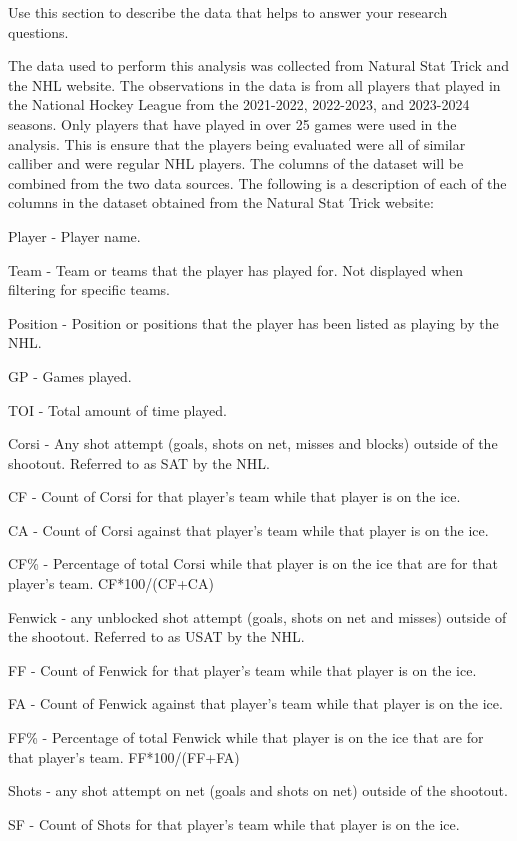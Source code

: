 \documentclass[12pt]{article}
\begin{document}
Use this section to describe the data that helps to answer your research
questions.

The data used to perform this analysis was collected from Natural Stat Trick and the NHL website. The observations in the data
is from all players that played in the National Hockey League from the 2021-2022, 2022-2023, and 2023-2024 seasons. Only players
that have played in over 25 games were used in the analysis. This is ensure that the players being evaluated were all of similar 
calliber and were regular NHL players. The columns of the dataset will be combined from the two data sources. The following is a 
description of each of the columns in the dataset obtained from the Natural Stat Trick website:

Player - Player name.

Team - Team or teams that the player has played for. Not displayed when filtering for specific teams.

Position - Position or positions that the player has been listed as playing by the NHL.

GP - Games played.

TOI - Total amount of time played.

Corsi - Any shot attempt (goals, shots on net, misses and blocks) outside of the shootout. Referred to as SAT by the NHL.

CF - Count of Corsi for that player's team while that player is on the ice.

CA - Count of Corsi against that player's team while that player is on the ice.

CF\% - Percentage of total Corsi while that player is on the ice that are for that player's team. CF*100/(CF+CA)

Fenwick - any unblocked shot attempt (goals, shots on net and misses) outside of the shootout. Referred to as USAT by the NHL.

FF - Count of Fenwick for that player's team while that player is on the ice.

FA - Count of Fenwick against that player's team while that player is on the ice.

FF\% - Percentage of total Fenwick while that player is on the ice that are for that player's team. FF*100/(FF+FA)

Shots - any shot attempt on net (goals and shots on net) outside of the shootout.

SF - Count of Shots for that player's team while that player is on the ice.
\end{document}

